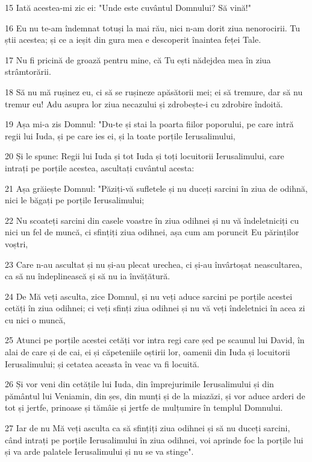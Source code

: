 \par 15 Iată acestea-mi zic ei: "Unde este cuvântul Domnului? Să vină!"
\par 16 Eu nu te-am îndemnat totuși la mai rău, nici n-am dorit ziua nenorocirii. Tu știi acestea; și ce a ieșit din gura mea e descoperit înaintea feței Tale.
\par 17 Nu fi pricină de groază pentru mine, că Tu ești nădejdea mea în ziua strâmtorării.
\par 18 Să nu mă rușinez eu, ci să se rușineze apăsătorii mei; ei să tremure, dar să nu tremur eu! Adu asupra lor ziua necazului și zdrobește-i cu zdrobire îndoită.
\par 19 Așa mi-a zis Domnul: "Du-te și stai la poarta fiilor poporului, pe care intră regii lui Iuda, și pe care ies ei, și la toate porțile Ierusalimului,
\par 20 Și le spune: Regii lui Iuda și tot Iuda și toți locuitorii Ierusalimului, care intrați pe porțile acestea, ascultați cuvântul acesta:
\par 21 Așa grăiește Domnul: "Păziți-vă sufletele și nu duceți sarcini în ziua de odihnă, nici le băgați pe porțile Ierusalimului;
\par 22 Nu scoateți sarcini din casele voastre în ziua odihnei și nu vă îndeletniciți cu nici un fel de muncă, ci sfințiți ziua odihnei, așa cum am poruncit Eu părinților voștri,
\par 23 Care n-au ascultat și nu și-au plecat urechea, ci și-au învârtoșat neascultarea, ca să nu îndeplinească și să nu ia învățătură.
\par 24 De Mă veți asculta, zice Domnul, și nu veți aduce sarcini pe porțile acestei cetăți în ziua odihnei; ci veți sfinți ziua odihnei și nu vă veți îndeletnici în acea zi cu nici o muncă,
\par 25 Atunci pe porțile acestei cetăți vor intra regi care șed pe scaunul lui David, în alai de care și de cai, ei și căpeteniile oștirii lor, oamenii din Iuda și locuitorii Ierusalimului; și cetatea aceasta în veac va fi locuită.
\par 26 Și vor veni din cetățile lui Iuda, din împrejurimile Ierusalimului și din pământul lui Veniamin, din șes, din munți și de la miazăzi, și vor aduce arderi de tot și jertfe, prinoase și tămâie și jertfe de mulțumire în templul Domnului.
\par 27 Iar de nu Mă veți asculta ca să sfințiți ziua odihnei și să nu duceți sarcini, când intrați pe porțile Ierusalimului în ziua odihnei, voi aprinde foc la porțile lui și va arde palatele Ierusalimului și nu se va stinge".

